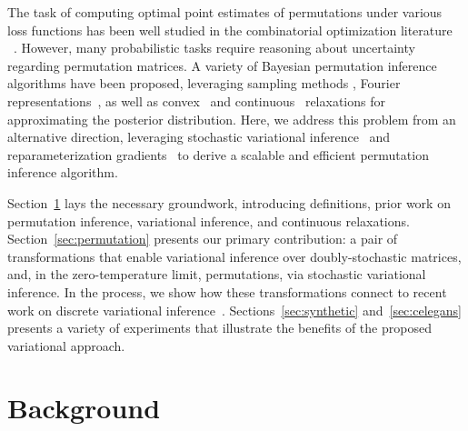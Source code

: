 \documentclass[twoside]{article}
\begin{document}
The task of computing optimal point estimates of permutations under
various loss functions has been well studied in the combinatorial
optimization literature ~\citep{kuhn1955hungarian,
  munkres1957algorithms, lawler1963quadratic}. However, many
probabilistic tasks require reasoning about uncertainty regarding
permutation matrices.  A variety of Bayesian permutation inference
algorithms have been proposed, leveraging sampling methods
\citep{diaconis1988group, miller2013exact, harrison2013importance},
Fourier representations~\citep{kondor2007multi, huang2009fourier}, as
well as convex~\citep{lim2014beyond} and
continuous~\citep{plis2011directional} relaxations for approximating
the posterior distribution.  Here, we address this problem from an
alternative direction, leveraging stochastic variational
inference~\citep{hoffman2013stochastic} and reparameterization
gradients~\citep{rezende2014stochastic, Kingma2014} to derive a
scalable and efficient permutation inference algorithm.

Section~\ref{sec:background} lays the necessary groundwork,
introducing definitions, prior work on permutation inference,
variational inference, and continuous relaxations.
Section~\ref{sec:permutation} presents our primary contribution: a
pair of transformations that enable variational inference over
doubly-stochastic matrices, and, in the zero-temperature limit,
permutations, via stochastic variational inference.  In the process,
we show how these transformations connect to recent work on discrete
variational inference~\citep{maddison2016concrete,
  jang2016categorical}.  Sections~\ref{sec:synthetic}
and~\ref{sec:celegans} presents a variety of experiments that
illustrate the benefits of the proposed variational approach.
  
\section{Background}
\label{sec:background}

\end{document}
